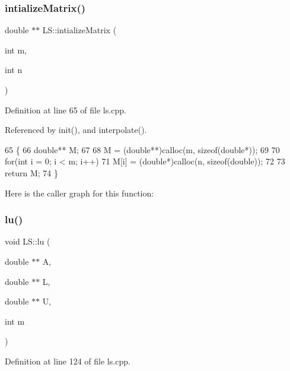 \subsubsection{\texorpdfstring{intialize\+Matrix()}{intializeMatrix()}}
{\footnotesize\ttfamily double $\ast$$\ast$ L\+S\+::intialize\+Matrix (\begin{DoxyParamCaption}\item[{int}]{m,  }\item[{int}]{n }\end{DoxyParamCaption})\hspace{0.3cm}{\ttfamily [private]}}



Definition at line 65 of file ls.\+cpp.



Referenced by init(), and interpolate().


\begin{DoxyCode}
65                                           \{
66     \textcolor{keywordtype}{double}** M;
67 
68     M = (\textcolor{keywordtype}{double}**)calloc(m, \textcolor{keyword}{sizeof}(\textcolor{keywordtype}{double}*));
69 
70     \textcolor{keywordflow}{for}(\textcolor{keywordtype}{int} i = 0; i < m; i++)
71         M[i] = (\textcolor{keywordtype}{double}*)calloc(n, \textcolor{keyword}{sizeof}(\textcolor{keywordtype}{double}));
72 
73     \textcolor{keywordflow}{return} M;
74 \}
\end{DoxyCode}
Here is the caller graph for this function\+:
\mbox{\label{class_l_s_aadf10e2c4121ce5f0b42981f7c1d15d7}} 
\subsubsection{\texorpdfstring{lu()}{lu()}}
{\footnotesize\ttfamily void L\+S\+::lu (\begin{DoxyParamCaption}\item[{double $\ast$$\ast$}]{A,  }\item[{double $\ast$$\ast$}]{L,  }\item[{double $\ast$$\ast$}]{U,  }\item[{int}]{m }\end{DoxyParamCaption})\hspace{0.3cm}{\ttfamily [private]}}



Definition at line 124 of file ls.\+cpp.



